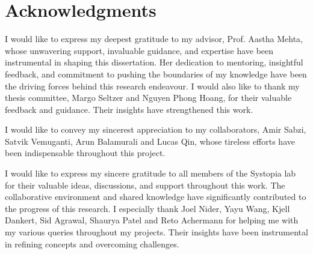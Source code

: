 
\chapter{Acknowledgments}

I would like to express my deepest gratitude to my advisor, Prof. Aastha Mehta, whose unwavering support, invaluable guidance, and expertise have been instrumental in shaping this dissertation. 
Her dedication to mentoring, insightful feedback, and commitment to pushing the boundaries of my knowledge have been the driving forces behind this research endeavour. 
I would also like to thank my thesis committee, Margo Seltzer and Nguyen Phong Hoang, for their valuable feedback and guidance. 
Their insights have strengthened this work.

I would like to convey my sincerest appreciation to my collaborators, Amir Sabzi, Satvik Vemuganti, Arun Balamurali and Lucas Qin, whose tireless efforts have been indispensable throughout this project.

I would like to express my sincere gratitude to all members of the Systopia lab for their valuable ideas, discussions, and support throughout this work. 
The collaborative environment and shared knowledge have significantly contributed to the progress of this research.
I especially thank Joel Nider, Yayu Wang, Kjell Dankert, Sid Agrawal, Shaurya Patel and Reto Achermann for helping me with my various queries throughout my projects.
Their insights have been instrumental in refining concepts and overcoming challenges. 


\begin{comment}

I extend my heartfelt gratitude to Prof. Margo Seltzer for her invaluable contributions as a committee member for this dissertation.
Her extensive knowledge and keen insights have greatly enriched the depth and quality of this work.

\end{comment}
